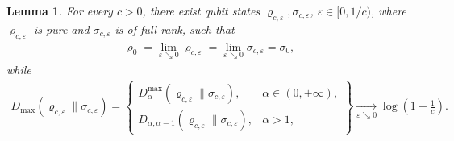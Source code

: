 \documentclass[unsortedaddress,superscriptaddress,pra,notitlepage]{revtex4}
\newtheorem{lemma}[definition]{Lemma}
\def\ep{\varepsilon}
\def\rho{\varrho}
\def\bz{\left(}
\def\jz{\right)}
\begin{document}
\begin{lemma}\label{lemma:a>1 discont}
For every $c>0$, there exist qubit states $\rho_{c,\ep},\sigma_{c,\ep}$, $\ep\in[0,1/c)$,
where $\rho_{c,\ep}$ is pure and $\sigma_{c,\ep}$ is of full rank,
such that 
\begin{align*}
\rho_0=\lim_{\ep\searrow 0}\rho_{c,\ep}=\lim_{\ep\searrow 0}\sigma_{c,\ep}=\sigma_0,
\end{align*}
while %
\begin{align}
D_{\max}(\rho_{c,\ep}\|\sigma_{c,\ep})
=
\left\{\begin{array}{ll}
D_{\alpha}^{\max}(\rho_{c,\ep}\|\sigma_{c,\ep}),&\alpha\in(0,+\infty),\\
D_{\alpha,\alpha-1}(\rho_{c,\ep}\|\sigma_{c,\ep}),&\alpha>1,
\end{array}\right\}
\xrightarrow[\ep\searrow 0]{}\log\bz 1+\frac{1}{c}\jz.\label{a>1 discont1}
\end{align}
\end{lemma}
\end{document}

